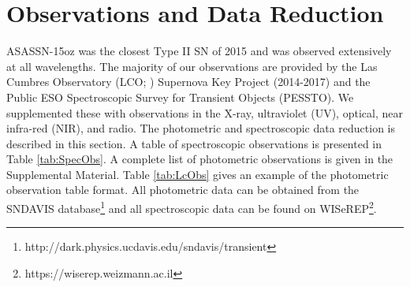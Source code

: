 \documentclass[a4paper,fleqn,usenatbib]{mnras}
\begin{document}
\section{Observations and Data Reduction}  \label{sec:Obs}
ASASSN-15oz was the closest Type II SN of 2015 and was observed extensively at all wavelengths. 
The majority of our observations are provided by the Las Cumbres Observatory (LCO; \citealt{2013brown}) Supernova Key Project (2014-2017) and the Public ESO Spectroscopic Survey for Transient Objects (PESSTO). 
We supplemented these with observations in the X-ray, ultraviolet (UV), optical, near infra-red (NIR), and radio. 
The photometric and spectroscopic data reduction is described in this section. 
A table of spectroscopic observations is presented in Table \ref{tab:SpecObs}.
A complete list of photometric observations is given in the Supplemental Material. 
Table \ref{tab:LcObs} gives an example of the photometric observation table format.  
All photometric data can be obtained from the SNDAVIS database\footnote{http://dark.physics.ucdavis.edu/sndavis/transient} and all spectroscopic data can be found on WISeREP\footnote{https://wiserep.weizmann.ac.il}.
\end{document}
